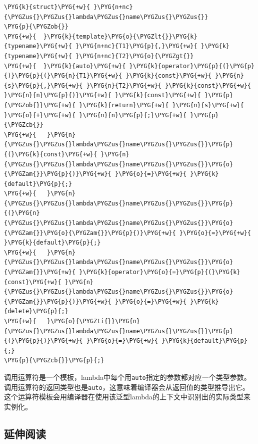 
\begin{codeblockbg}
\begin{Verbatim}[commandchars=\\\{\},breaklines=true,breakanywhere=true,fontsize=\codefont,xleftmargin=17bp]
\PYG{k}{struct}\PYG{+w}{ }\PYG{n+nc}{\PYGZus{}\PYGZus{}lambda\PYGZus{}name\PYGZus{}\PYGZus{}}
\PYG{p}{\PYGZob{}}
\PYG{+w}{  }\PYG{k}{template}\PYG{o}{\PYGZlt{}}\PYG{k}{typename}\PYG{+w}{ }\PYG{n+nc}{T1}\PYG{p}{,}\PYG{+w}{ }\PYG{k}{typename}\PYG{+w}{ }\PYG{n+nc}{T2}\PYG{o}{\PYGZgt{}}
\PYG{+w}{  }\PYG{k}{auto}\PYG{+w}{ }\PYG{k}{operator}\PYG{p}{(}\PYG{p}{)}\PYG{p}{(}\PYG{n}{T1}\PYG{+w}{ }\PYG{k}{const}\PYG{+w}{ }\PYG{n}{s}\PYG{p}{,}\PYG{+w}{ }\PYG{n}{T2}\PYG{+w}{ }\PYG{k}{const}\PYG{+w}{ }\PYG{n}{n}\PYG{p}{)}\PYG{+w}{ }\PYG{k}{const}\PYG{+w}{ }\PYG{p}{\PYGZob{}}\PYG{+w}{ }\PYG{k}{return}\PYG{+w}{ }\PYG{n}{s}\PYG{+w}{ }\PYG{o}{+}\PYG{+w}{ }\PYG{n}{n}\PYG{p}{;}\PYG{+w}{ }\PYG{p}{\PYGZcb{}}
\PYG{+w}{   }\PYG{n}{\PYGZus{}\PYGZus{}lambda\PYGZus{}name\PYGZus{}\PYGZus{}}\PYG{p}{(}\PYG{k}{const}\PYG{+w}{ }\PYG{n}{\PYGZus{}\PYGZus{}lambda\PYGZus{}name\PYGZus{}\PYGZus{}}\PYG{o}{\PYGZam{}}\PYG{p}{)}\PYG{+w}{ }\PYG{o}{=}\PYG{+w}{ }\PYG{k}{default}\PYG{p}{;}
\PYG{+w}{   }\PYG{n}{\PYGZus{}\PYGZus{}lambda\PYGZus{}name\PYGZus{}\PYGZus{}}\PYG{p}{(}\PYG{n}{\PYGZus{}\PYGZus{}lambda\PYGZus{}name\PYGZus{}\PYGZus{}}\PYG{o}{\PYGZam{}}\PYG{o}{\PYGZam{}}\PYG{p}{)}\PYG{+w}{ }\PYG{o}{=}\PYG{+w}{ }\PYG{k}{default}\PYG{p}{;}
\PYG{+w}{   }\PYG{n}{\PYGZus{}\PYGZus{}lambda\PYGZus{}name\PYGZus{}\PYGZus{}}\PYG{o}{\PYGZam{}}\PYG{+w}{ }\PYG{k}{operator}\PYG{o}{=}\PYG{p}{(}\PYG{k}{const}\PYG{+w}{ }\PYG{n}{\PYGZus{}\PYGZus{}lambda\PYGZus{}name\PYGZus{}\PYGZus{}}\PYG{o}{\PYGZam{}}\PYG{p}{)}\PYG{+w}{ }\PYG{o}{=}\PYG{+w}{ }\PYG{k}{delete}\PYG{p}{;}
\PYG{+w}{   }\PYG{o}{\PYGZti{}}\PYG{n}{\PYGZus{}\PYGZus{}lambda\PYGZus{}name\PYGZus{}\PYGZus{}}\PYG{p}{(}\PYG{p}{)}\PYG{+w}{ }\PYG{o}{=}\PYG{+w}{ }\PYG{k}{default}\PYG{p}{;}
\PYG{p}{\PYGZcb{}}\PYG{p}{;}
\end{Verbatim}
\end{codeblockbg}



调用运算符是一个模板，lambda中每个用\texttt{auto}指定的参数都对应一个类型参数。调用运算符的返回类型也是\texttt{auto}，这意味着编译器会从返回值的类型推导出它。这个运算符模板会用编译器在使用该泛型lambda的上下文中识别出的实际类型来实例化。



\subsection{延伸阅读}


